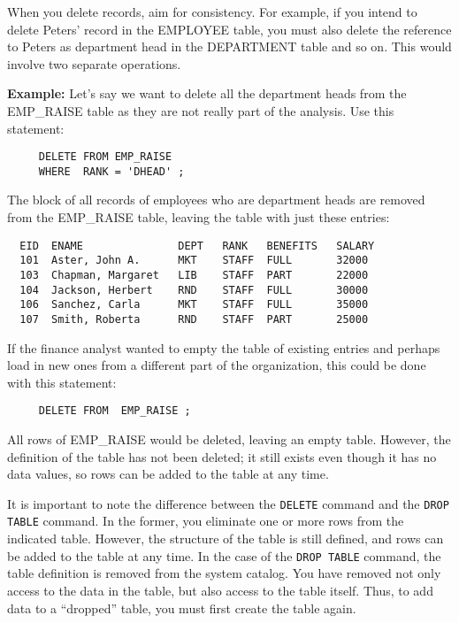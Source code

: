 When you delete records, aim for consistency.  For example, if you
intend to delete Peters' record in the EMPLOYEE table, you must also
delete the reference to Peters as department head in the DEPARTMENT
table and so on.  This would involve two separate operations.

{\bf Example:}
Let's say we want to delete all the department heads from the
EMP\_RAISE table as they are not really part of the analysis.  Use
this statement:

\begin{verbatim}
     DELETE FROM EMP_RAISE
     WHERE  RANK = 'DHEAD' ;
\end{verbatim}

The block of all records of employees who are department heads are
removed from the EMP\_RAISE table, leaving the table with just these
entries:

\begin{screen}
\begin{verbatim}
  EID  ENAME               DEPT   RANK   BENEFITS   SALARY
  101  Aster, John A.      MKT    STAFF  FULL       32000
  103  Chapman, Margaret   LIB    STAFF  PART       22000
  104  Jackson, Herbert    RND    STAFF  FULL       30000
  106  Sanchez, Carla      MKT    STAFF  FULL       35000
  107  Smith, Roberta      RND    STAFF  PART       25000
\end{verbatim}
\end{screen}

If the finance analyst wanted to empty the table of existing entries
and perhaps load in new ones from a different part of the
organization, this could be done with this statement:
\begin{verbatim}
     DELETE FROM  EMP_RAISE ;
\end{verbatim}

All rows of EMP\_RAISE would be deleted, leaving an empty table.
However, the definition of the table has not been deleted; it still
exists even though it has no data values, so rows can be added to the
table at any time.

It is important to note the difference between the \verb`DELETE` command and
the {\tt DROP TABLE} command.  In the former, you eliminate one or more rows
from the indicated table.  However, the structure of the table is
still defined, and rows can be added to the table at any time.  In the
case of the {\tt DROP TABLE} command, the table definition is removed from
the system catalog.  You have removed not only access to the data in
the table, but also access to the table itself.  Thus, to add data to
a ``dropped'' table, you must first create the table again.

